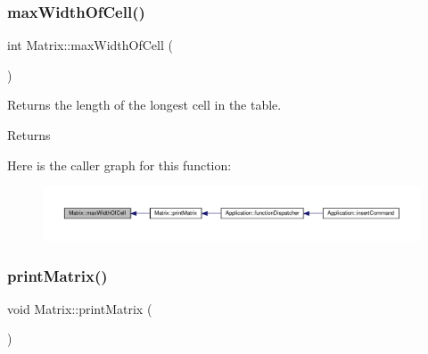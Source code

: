 \subsubsection{\texorpdfstring{max\+Width\+Of\+Cell()}{maxWidthOfCell()}}
{\footnotesize\ttfamily int Matrix\+::max\+Width\+Of\+Cell (\begin{DoxyParamCaption}{ }\end{DoxyParamCaption})\hspace{0.3cm}{\ttfamily [private]}}

Returns the length of the longest cell in the table. \begin{DoxyReturn}{Returns}

\end{DoxyReturn}
Here is the caller graph for this function\+:
\nopagebreak
\begin{figure}[H]
\begin{center}
\leavevmode
\includegraphics[width=350pt]{class_matrix_a60dac9b70e73a12d2adb32d6be9ff65d_icgraph}
\end{center}
\end{figure}
\mbox{\label{class_matrix_aa1967ad240a5ffaf492800044b7275d9}} 
\subsubsection{\texorpdfstring{print\+Matrix()}{printMatrix()}}
{\footnotesize\ttfamily void Matrix\+::print\+Matrix (\begin{DoxyParamCaption}{ }\end{DoxyParamCaption})}

